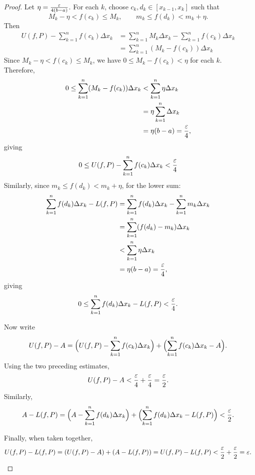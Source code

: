 \begin{problem}
\begin{proof}
    Let $\eta = \frac{\varepsilon}{4(b-a)}$.
    For each $k$, choose $c_k,d_k\in[x_{k-1},x_k]$ such that
    \[
      M_k-\eta < f(c_k)\le M_k, \qquad m_k\le f(d_k)< m_k+\eta.
    \]
    Then
    \begin{align*}
      U(f,P)-\sum_{k=1}^n f(c_k)\Delta x_k &= \sum_{k=1}^n M_k\Delta x_k - \sum_{k=1}^n f(c_k)\Delta x_k\\
      &= \sum_{k=1}^n (M_k - f(c_k))\Delta x_k
    \end{align*}
    Since $M_k-\eta < f(c_k) \leq M_k$, we have $0 \leq M_k - f(c_k) < \eta$ for each $k$. Therefore,
    \begin{align*}
      0 \leq \sum_{k=1}^n (M_k - f(c_k))\Delta x_k &< \sum_{k=1}^n \eta\Delta x_k\\
      &= \eta \sum_{k=1}^n \Delta x_k\\
      &= \eta(b-a) = \frac{\varepsilon}{4},
    \end{align*}
    giving
    \[
      0 \le U(f,P)-\sum_{k=1}^n f(c_k)\Delta x_k < \frac{\varepsilon}{4}
    \]
    Similarly, since $m_k \leq f(d_k) < m_k+\eta$, for the lower sum:
    \begin{align*}
      \sum_{k=1}^n f(d_k)\Delta x_k - L(f,P) &= \sum_{k=1}^n f(d_k)\Delta x_k - \sum_{k=1}^n m_k\Delta x_k\\
      &= \sum_{k=1}^n (f(d_k) - m_k)\Delta x_k\\
      &< \sum_{k=1}^n \eta\Delta x_k\\
      &= \eta(b-a) = \frac{\varepsilon}{4},
    \end{align*}
    giving
    \[
      0 \le \sum_{k=1}^n f(d_k)\Delta x_k - L(f,P) < \frac{\varepsilon}{4}.
    \]

    Now write
    \[
      U(f,P)-A = \Bigl(U(f,P)-\sum_{k=1}^n f(c_k)\Delta x_k\Bigr) + \Bigl(\sum_{k=1}^n f(c_k)\Delta x_k - A\Bigr).
    \]
    Using the two preceding estimates,
    \[
      U(f,P)-A < \frac{\varepsilon}{4}+\frac{\varepsilon}{4} = \frac{\varepsilon}{2}.
    \]
    Similarly,
    \[
      A-L(f,P) = \Bigl(A-\sum_{k=1}^n f(d_k)\Delta x_k\Bigr) + \Bigl(\sum_{k=1}^n f(d_k)\Delta x_k - L(f,P)\Bigr) < \frac{\varepsilon}{2}.
    \]

    Finally, when taken together,
    \[
      U(f,P)-L(f,P) = (U(f,P)-A)+(A-L(f,P)) = U(f,P)-L(f,P) < \frac{\varepsilon}{2}+\frac{\varepsilon}{2} = \varepsilon.
    \]
  \end{proof}

\end{problem}

